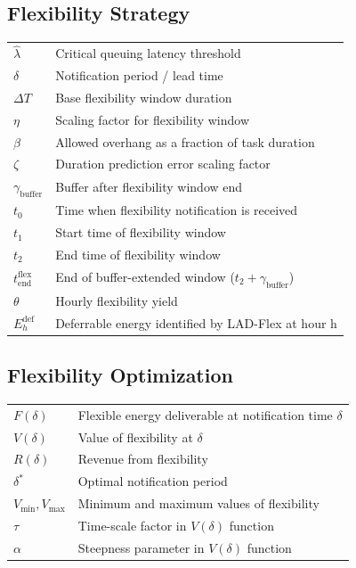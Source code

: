\documentclass[preprint,12pt]{elsarticle}
\begin{document}
\subsection*{Flexibility Strategy}
\begin{tabular}{ll}
$\hat{\lambda}$ & Critical queuing latency threshold \\
$\delta$ & Notification period / lead time \\
$\Delta T$ & Base flexibility window duration \\
$\eta$ & Scaling factor for flexibility window \\
$\beta$ & Allowed overhang as a fraction of task duration \\
$\zeta$ & Duration prediction error scaling factor \\
$\gamma_{\text{buffer}}$ & Buffer after flexibility window end \\
$t_0$ & Time when flexibility notification is received \\
$t_1$ & Start time of flexibility window \\
$t_2$ & End time of flexibility window \\
$t_{\text{end}}^{\text{flex}}$ & End of buffer-extended window ($t_2 + \gamma_{\text{buffer}}$) \\
$\theta$ & Hourly flexibility yield \\
$E_h^{\text{def}}$ & Deferrable energy identified by LAD-Flex at hour h \\
\end{tabular}

\vspace{1em}

\subsection*{Flexibility Optimization}
\begin{tabular}{ll}
$F(\delta)$ & Flexible energy deliverable at notification time $\delta$ \\
$V(\delta)$ & Value of flexibility at $\delta$ \\
$R(\delta)$ & Revenue from flexibility \\
$\delta^*$ & Optimal notification period \\
$V_{\min}, V_{\max}$ & Minimum and maximum values of flexibility \\
$\tau$ & Time-scale factor in $V(\delta)$ function \\
$\alpha$ & Steepness parameter in $V(\delta)$ function \\
\end{tabular}
\end{document}

